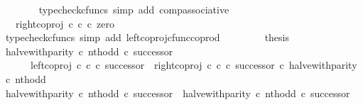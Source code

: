 \begin{isabellebody}
\ \ \ \ \ \ \isamarkupfalse%
\ {\isacharparenleft}{\kern0pt}typecheck{\isacharunderscore}{\kern0pt}cfuncs{\isacharcomma}{\kern0pt}\ simp\ add{\isacharcolon}{\kern0pt}\ comp{\isacharunderscore}{\kern0pt}associative{}{\isacharparenright}{\kern0pt}\isanewline
\ \ \ \ \isamarkupfalse%
\ \isamarkupfalse%
\ {\isachardoublequoteopen}{\isachardot}{\kern0pt}{\isachardot}{\kern0pt}{\isachardot}{\kern0pt}\ {\isacharequal}{\kern0pt}\ right{\isacharunderscore}{\kern0pt}coproj\ {\isasymnat}\isactrlsub c\ {\isasymnat}\isactrlsub c\ {\isasymcirc}\isactrlsub c\ zero{\isachardoublequoteclose}\isanewline
\ \ \ \ \ \ \isamarkupfalse%
\ {\isacharparenleft}{\kern0pt}typecheck{\isacharunderscore}{\kern0pt}cfuncs{\isacharcomma}{\kern0pt}\ simp\ add{\isacharcolon}{\kern0pt}\ left{\isacharunderscore}{\kern0pt}coproj{\isacharunderscore}{\kern0pt}cfunc{\isacharunderscore}{\kern0pt}coprod{\isacharparenright}{\kern0pt}\isanewline
\ \ \ \ \isamarkupfalse%
\ \ \isamarkupfalse%
\ {\isacharquery}{\kern0pt}thesis\isacommand{{\isachardot}{\kern0pt}}\isamarkupfalse%
\isanewline
\ \ \isamarkupfalse%
\isanewline
\isanewline
\ \ \isamarkupfalse%
\ {\isachardoublequoteopen}{\isacharparenleft}{\kern0pt}halve{\isacharunderscore}{\kern0pt}with{\isacharunderscore}{\kern0pt}parity\ {\isasymcirc}\isactrlsub c\ nth{\isacharunderscore}{\kern0pt}odd{\isacharparenright}{\kern0pt}\ {\isasymcirc}\isactrlsub c\ successor\ {\isacharequal}{\kern0pt}\isanewline
\ \ \ \ \ \ {\isacharparenleft}{\kern0pt}left{\isacharunderscore}{\kern0pt}coproj\ {\isasymnat}\isactrlsub c\ {\isasymnat}\isactrlsub c\ {\isasymcirc}\isactrlsub c\ successor{\isacharparenright}{\kern0pt}\ {\isasymamalg}\ {\isacharparenleft}{\kern0pt}right{\isacharunderscore}{\kern0pt}coproj\ {\isasymnat}\isactrlsub c\ {\isasymnat}\isactrlsub c\ {\isasymcirc}\isactrlsub c\ successor{\isacharparenright}{\kern0pt}\ {\isasymcirc}\isactrlsub c\ halve{\isacharunderscore}{\kern0pt}with{\isacharunderscore}{\kern0pt}parity\ {\isasymcirc}\isactrlsub c\ nth{\isacharunderscore}{\kern0pt}odd{\isachardoublequoteclose}\isanewline
\ \ \isamarkupfalse%
\ {\isacharminus}{\kern0pt}\isanewline
\ \ \ \ \isamarkupfalse%
\ {\isachardoublequoteopen}{\isacharparenleft}{\kern0pt}halve{\isacharunderscore}{\kern0pt}with{\isacharunderscore}{\kern0pt}parity\ {\isasymcirc}\isactrlsub c\ nth{\isacharunderscore}{\kern0pt}odd{\isacharparenright}{\kern0pt}\ {\isasymcirc}\isactrlsub c\ successor\ {\isacharequal}{\kern0pt}\ halve{\isacharunderscore}{\kern0pt}with{\isacharunderscore}{\kern0pt}parity\ {\isasymcirc}\isactrlsub c\ nth{\isacharunderscore}{\kern0pt}odd\ {\isasymcirc}\isactrlsub c\ successor{\isachardoublequoteclose}\isanewline

\end{isabellebody}
